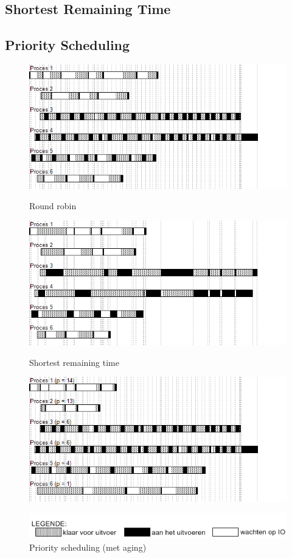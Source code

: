 \subsection{Shortest Remaining Time}


\subsection{Priority Scheduling}


\begin{figure}
\begin{center}
  \includegraphics[width=\linewidth]{images/schedule_rr.png}
  \caption{Round robin}
  \label{fig:schedrr}
  \centering
  \includegraphics[width=\linewidth]{images/schedule_srt.png}
  \caption{Shortest remaining time}
  \label{fig:schedsrt}
  \centering
  \includegraphics[width=\linewidth]{images/schedule_ps_qua_age.png}
  \caption{Priority scheduling (met aging)}
  \label{fig:schedpspre}
  \includegraphics[width=0.8\linewidth]{images/legende.png}
\end{center}
\end{figure}


